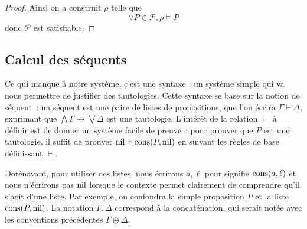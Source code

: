 \begin{proof}
  Ainsi on a construit $\rho$ telle que
  \[\forall P \in\mathcal P, \rho\models P\]
  donc $\mathcal P$ est satisfiable.
\end{proof}

\subsection{Calcul des séquents}

Ce qui manque à notre système, c'est une syntaxe : un système simple qui va nous
permettre de justifier des tautologies. Cette syntaxe se base sur la notion de
séquent~: un séquent est une paire de listes de propositions, que l'on écrira
$\Gamma\vdash \Delta$, exprimant que $\bigwedge \Gamma \to \bigvee \Delta$ est
une tautologie. L'intérêt de la relation $\vdash$ à définir est de donner un
système facile de preuve~: pour prouver que $P$ est une tautologie, il suffit
de prouver $\operatorname{nil}\vdash \operatorname{cons}(P,\operatorname{nil})$ en suivant les règles de base définissant
$\vdash$.

\begin{notation}
  Dorénavant, pour utiliser des listes, nous écrirons $a, \ell$ pour signifie
  $\operatorname{cons}(a,\ell)$ et nous n'écrirons pas $\operatorname{nil}$ lorsque le contexte permet
  clairement de comprendre qu'il s'agit d'une liste. Par exemple, on confondra
  la simple proposition $P$ et la liste $\operatorname{cons}(P,\operatorname{nil})$. La notation
  $\Gamma,\Delta$ correspond à la concaténation, qui serait notée avec les
  conventions précédentes $\Gamma\oplus\Delta$.
\end{notation}

